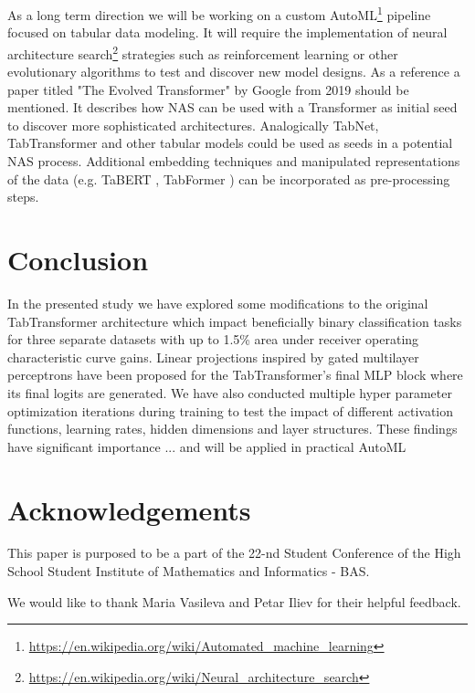 \documentclass{article}
\begin{document}
As a long term direction we will be working on a custom AutoML\footnote{\url{https://en.wikipedia.org/wiki/Automated_machine_learning}} pipeline focused on tabular data modeling. It will require the implementation of neural architecture search\footnote{\url{https://en.wikipedia.org/wiki/Neural_architecture_search}} strategies such as reinforcement learning or other evolutionary algorithms \cite{elsken2019neural} to test and discover new model designs. As a reference a paper titled "The Evolved Transformer" \cite{so2019evolved} by Google from 2019 should be mentioned. It describes how NAS can be used with a Transformer \cite{vaswani2017attention} as initial seed to discover more sophisticated architectures. Analogically TabNet, TabTransformer and other tabular models could be used as seeds in a potential NAS process. Additional embedding techniques and manipulated representations of the data (e.g. TaBERT \cite{yin2020tabert}, TabFormer \cite{padhi2021tabular}) can be incorporated as pre-processing steps.

\section{Conclusion}

In the presented study we have explored some modifications to the original TabTransformer \cite{Huang2020TabTransformerTD} architecture which impact beneficially binary classification tasks for three separate datasets with up to 1.5\% area under receiver operating characteristic curve gains. Linear projections inspired by gated multilayer perceptrons \cite{Liu2021PayAT} have been proposed for the TabTransformer's final MLP block where its final logits are generated. We have also conducted multiple hyper parameter optimization iterations during training to test the impact of different activation functions, learning rates, hidden dimensions and layer structures. These findings have significant importance  ... and will be applied in practical AutoML 

\section{Acknowledgements}

This paper is purposed to be a part of the 22-nd Student Conference of the High School Student Institute of Mathematics and Informatics - BAS.

We would like to thank Maria Vasileva and Petar Iliev for their helpful feedback.
\end{document}

